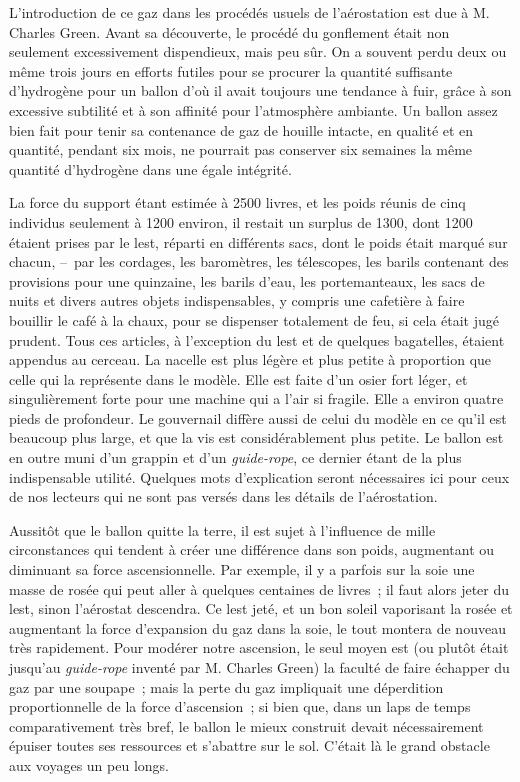 \documentclass[french,twoside]{book} %
\begin{document}
L’introduction de ce gaz dans les procédés usuels de l’aérostation est due à M. Charles Green. Avant sa découverte, le procédé du gonflement était non seulement excessivement dispendieux, mais peu sûr. On a souvent perdu deux ou même trois jours en efforts futiles pour se procurer la quantité suffisante d’hydrogène pour un ballon d’où il avait toujours une tendance à fuir, grâce à son excessive subtilité et à son affinité pour l’atmosphère ambiante. Un ballon assez bien fait pour tenir sa contenance de gaz de houille intacte, en qualité et en quantité, pendant six mois, ne pourrait pas conserver six semaines la même quantité d’hydrogène dans une égale intégrité.\par
La force du support étant estimée à 2500 livres, et les poids réunis de cinq individus seulement à 1200 environ, il restait un surplus de 1300, dont 1200 étaient prises par le lest, réparti en différents sacs, dont le poids était marqué sur chacun, – par les cordages, les baromètres, les télescopes, les barils contenant des provisions pour une quinzaine, les barils d’eau, les portemanteaux, les sacs de nuits et divers autres objets indispensables, y compris une cafetière à faire bouillir le café à la chaux, pour se dispenser totalement de feu, si cela était jugé prudent. Tous ces articles, à l’exception du lest et de quelques bagatelles, étaient appendus au cerceau. La nacelle est plus légère et plus petite à proportion que celle qui la représente dans le modèle. Elle est faite d’un osier fort léger, et singulièrement forte pour une machine qui a l’air si fragile. Elle a environ quatre pieds de profondeur. Le gouvernail diffère aussi de celui du modèle en ce qu’il est beaucoup plus large, et que la vis est considérablement plus petite. Le ballon est en outre muni d’un grappin et d’un \emph{guide-rope}, ce dernier étant de la plus indispensable utilité. Quelques mots d’explication seront nécessaires ici pour ceux de nos lecteurs qui ne sont pas versés dans les détails de l’aérostation.\par
Aussitôt que le ballon quitte la terre, il est sujet à l’influence de mille circonstances qui tendent à créer une différence dans son poids, augmentant ou diminuant sa force ascensionnelle. Par exemple, il y a parfois sur la soie une masse de rosée qui peut aller à quelques centaines de livres ; il faut alors jeter du lest, sinon l’aérostat descendra. Ce lest jeté, et un bon soleil vaporisant la rosée et augmentant la force d’expansion du gaz dans la soie, le tout montera de nouveau très rapidement. Pour modérer notre ascension, le seul moyen est (ou plutôt était jusqu’au \emph{guide-rope} inventé par M. Charles Green) la faculté de faire échapper du gaz par une soupape ; mais la perte du gaz impliquait une déperdition proportionnelle de la force d’ascension ; si bien que, dans un laps de temps comparativement très bref, le ballon le mieux construit devait nécessairement épuiser toutes ses ressources et s’abattre sur le sol. C’était là le grand obstacle aux voyages un peu longs.\par
\end{document}
